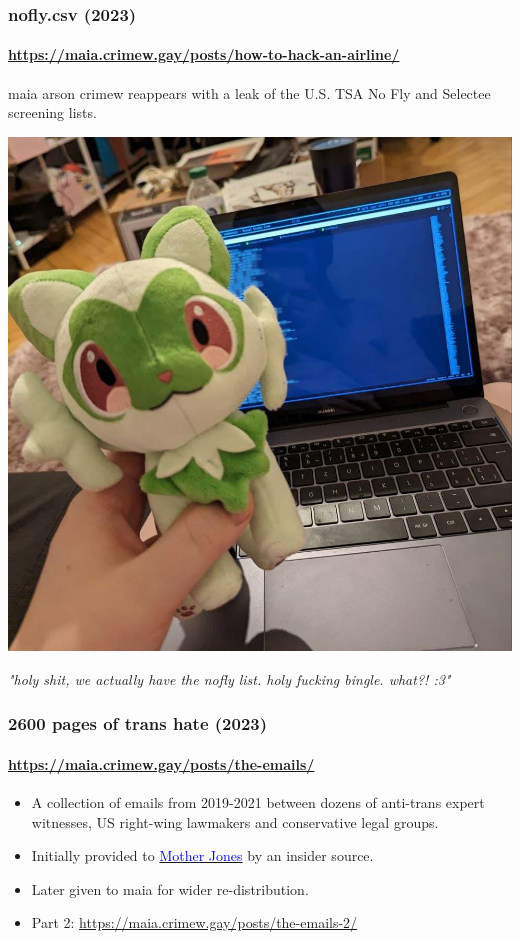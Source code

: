 \documentclass[aspectratio=169,usenames,dvipsnames]{beamer}
\begin{document}
\begin{frame}
  \frametitle{nofly.csv (2023)}
  \framesubtitle{\url{https://maia.crimew.gay/posts/how-to-hack-an-airline/}}

  \footnotesize
  maia arson crimew reappears with a leak of the U.S. TSA No Fly and Selectee
  screening lists.

  \centering \vfill
  \includegraphics[width=\textwidth,height=0.6\textheight,keepaspectratio]{img/weed-cat-crimes.jpg}

  \emph{"holy shit, we actually have the nofly list. holy fucking bingle.
  what?! :3"}

\end{frame}

\begin{frame}
  \frametitle{2600 pages of trans hate (2023)}
  \framesubtitle{\url{https://maia.crimew.gay/posts/the-emails/}}

  \begin{itemize}[<+->]
    \item A collection of emails from 2019-2021 between dozens of anti-trans
      expert witnesses, US right-wing lawmakers and conservative legal groups.
    \item Initially provided to
      \href{https://www.motherjones.com/politics/2023/03/anti-trans-transgender-health-care-ban-legislation-bill-minors-children-lgbtq/}{\textcolor{blue}{Mother
      Jones}} by an insider source.
    \item Later given to maia for wider re-distribution.
    \item Part 2: \url{https://maia.crimew.gay/posts/the-emails-2/}
  \end{itemize}

\end{frame}
\end{document}
